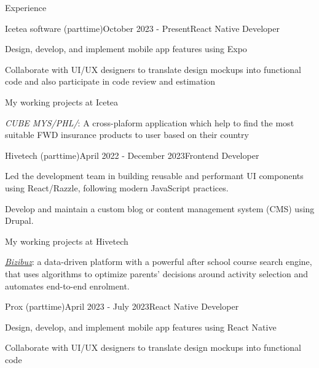 \documentclass{resume}
\begin{document}
\begin{rSection}{Experience}
    

    \begin{rSubsection}{Icetea software (parttime)}{October 2023 - Present}{React Native Developer}{}
      \item Design, develop, and implement mobile app features using Expo
      \item Collaborate with UI/UX designers to translate design mockups into functional code and also participate in code review and estimation
    \end{rSubsection}

    \vspace{-0.5cm}\begin{rSubsection}{}{}{My working projects at Icetea}{}
      \item {\emph{CUBE MYS/PHL/}}: A cross-plaform application which help to find the most suitable FWD insurance products to user based on their country
    \end{rSubsection}

    \vspace{0.8cm}\begin{rSubsection}{Hivetech (parttime)}{April 2022 - December 2023}{Frontend Developer}{}
      \item Led the development team in building reusable and performant UI components using React/Razzle, following modern JavaScript practices.
      \item Develop and maintain a custom blog or content management system (CMS) using Drupal. 
    \end{rSubsection}

    \vspace{-0.5cm}\begin{rSubsection}{}{}{My working projects at Hivetech}{}
      \item \href{https://bizibuz.com/}{\emph{Bizibuz}}: a data-driven platform with a powerful after school course search engine, that uses algorithms to optimize parents’ decisions around activity selection and automates end-to-end enrolment.
    \end{rSubsection}

    \vspace{0.8cm}\begin{rSubsection}{Prox (parttime)}{April 2023 - July 2023}{React Native Developer}{}
      \item Design, develop, and implement mobile app features using React Native
      \item Collaborate with UI/UX designers to translate design mockups into functional code
    \end{rSubsection}


\end{rSection}
\end{document}
